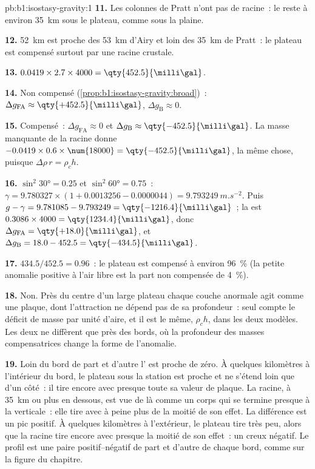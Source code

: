 \begin{solution}{pb:b1:isostasy-gravity:1}
\textbf{11.} Les colonnes de Pratt n'ont pas de racine~: le  reste à environ \qty{35}{km}
sous le plateau, comme sous la plaine.

\textbf{12.} \qty{52}{km} est proche des \qty{53}{km} d'Airy et loin des \qty{35}{km} de
Pratt~: le plateau est compensé surtout par une racine crustale.

\textbf{13.} $0.0419\times2.7\times4000 = \qty{452.5}{\milli\gal}$.

\textbf{14.} Non compensé (\cref{prop:b1:isostasy-gravity:broad})~:
$\Delta g_{\mathrm{FA}} \approx \qty{+452.5}{\milli\gal}$,
$\Delta g_{\mathrm B} \approx 0$.

\textbf{15.} Compensé~: $\Delta g_{\mathrm{FA}} \approx 0$ et
$\Delta g_{\mathrm B} \approx \qty{-452.5}{\milli\gal}$. La masse manquante de la racine
donne $-0.0419\times0.6\times\num{18000} = \qty{-452.5}{\milli\gal}$, la même chose,
puisque $\Delta\rho\,r = \rho_c h$.

\textbf{16.} $\sin^2\ang{30} = 0.25$ et $\sin^2\ang{60} = 0.75$~:
$\gamma = 9.780327\times(1 + 0.0013256 - 0.0000044) = \qty{9.793249}{m.s^{-2}}$.
Puis $g - \gamma = 9.781085 - 9.793249 = \qty{-1216.4}{\milli\gal}$~; la  est $0.3086\times4000 = \qty{1234.4}{\milli\gal}$, donc
$\Delta g_{\mathrm{FA}} = \qty{+18.0}{\milli\gal}$, et
$\Delta g_{\mathrm B} = 18.0 - 452.5 = \qty{-434.5}{\milli\gal}$.

\textbf{17.} $434.5/452.5 = 0.96$~: le plateau est compensé à environ \qty{96}{\percent}
(la petite anomalie positive à l'air libre est la part non compensée de
\qty{4}{\percent}).

\textbf{18.} Non. Près du centre d'un large plateau chaque couche anormale agit
comme une plaque, dont l'attraction ne dépend pas de sa profondeur~: seul compte le déficit
de masse par unité d'aire, et il est le même, $\rho_c h$, dans les deux modèles. Les deux
ne diffèrent que près des bords, où la profondeur des masses compensatrices change
la forme de l'anomalie.

\textbf{19.} Loin du bord de part et d'autre l' est proche de zéro.
À quelques kilomètres à l'intérieur du bord, le plateau sous la station est proche et
ne s'étend loin que d'un côté~: il tire encore avec presque toute sa valeur de plaque.
La racine, à \qty{35}{km} ou plus en dessous, est vue de là comme un corps qui se termine
presque à la verticale~: elle tire avec à peine plus de la moitié de son effet. La
différence est un pic positif. À quelques kilomètres à l'extérieur, le plateau tire
très peu, alors que la racine tire encore avec presque la moitié de son effet~: un creux
négatif. Le profil est une paire positif--négatif de part et d'autre de chaque bord, comme sur la
figure du chapitre.


\end{solution}
